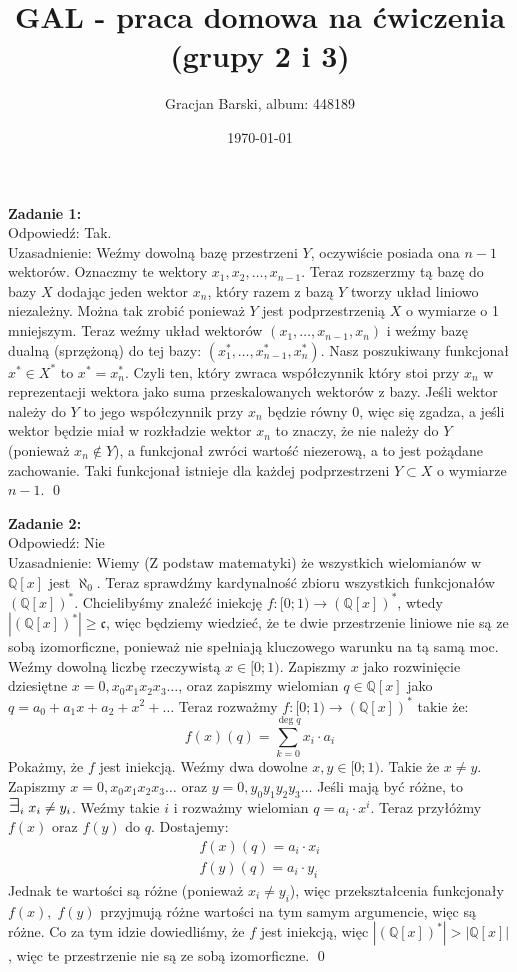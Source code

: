 \documentclass[11pt]{article}
\title{GAL - praca domowa na ćwiczenia (grupy 2 i 3)}
\author{Gracjan Barski, album: 448189}
\date{\today}
\newcommand{\Q}{\mathbb{Q}}
\newcommand{\cont}{\mathfrak{c}}
\newcommand{\Exists}{{\Large\mbox{$\exists$}}}
\begin{document}
\maketitle
\textbf{Zadanie 1:} \\[10pt]
Odpowiedź: Tak. \\[5pt]
Uzasadnienie: Weźmy dowolną bazę przestrzeni $Y$, oczywiście posiada ona $n - 1$ wektorów. Oznaczmy te wektory $x_1, x_2, \ldots, x_{n-1}$. Teraz rozszerzmy tą bazę do bazy $X$ dodając jeden wektor $x_n$, który razem z bazą $Y$ tworzy układ liniowo niezależny. Można tak zrobić ponieważ $Y$ jest podprzestrzenią $X$ o wymiarze o 1 mniejszym. Teraz weźmy układ wektorów $(x_1, \ldots, x_{n - 1}, x_n)$ i weźmy bazę dualną (sprzężoną) do tej bazy: $(x_1^*, \ldots, x_{n - 1}^*, x_n^*)$. Nasz poszukiwany funkcjonał $x^* \in X^*$ to $x^* = x_n^*$. Czyli ten, który zwraca współczynnik który stoi przy $x_n$ w reprezentacji wektora jako suma przeskalowanych wektorów z bazy. Jeśli wektor należy do $Y$ to jego współczynnik przy $x_n$ będzie równy 0, więc się zgadza, a jeśli wektor będzie miał w rozkładzie wektor $x_n$ to znaczy, że nie należy do $Y$ (ponieważ $x_n \notin Y$), a funkcjonał zwróci wartość niezerową, a to jest pożądane zachowanie. Taki funkcjonał istnieje dla każdej podprzestrzeni $Y \subset X$ o wymiarze $n - 1$. \qed

\vspace{20pt}

\textbf{Zadanie 2:} \\[10pt]
Odpowiedź: Nie \\[10pt]
Uzasadnienie: Wiemy (Z podstaw matematyki) że wszystkich wielomianów w $\Q[x]$ jest $\aleph_0$. Teraz sprawdźmy kardynalność zbioru wszystkich funkcjonałów $(\Q[x])^*$. Chcielibyśmy znaleźć iniekcję $f \colon [0; 1) \to (\Q[x])^*$, wtedy $|(\Q[x])^*| \geq \cont$, więc będziemy wiedzieć, że te dwie przestrzenie liniowe nie są ze sobą izomorficzne, ponieważ nie spełniają kluczowego warunku na tą samą moc. \\[5pt]
Weźmy dowolną liczbę rzeczywistą $x \in [0; 1)$. Zapiszmy $x$ jako rozwinięcie dziesiętne $x = 0,x_0x_1x_2x_3\ldots$, oraz zapiszmy wielomian $q \in \Q[x]$ jako $q = a_0 + a_1 x + a_2 + x^2 + \ldots$ Teraz rozważmy $f \colon [0; 1) \to (\Q[x])^*$ takie że:
$$f(x)(q) = \sum_{k = 0}^{\deg q} x_i \cdot a_i$$
Pokażmy, że $f$ jest iniekcją. Weźmy dwa dowolne $x, y \in [0; 1)$. Takie że $x \neq y$. Zapiszmy $x = 0,x_0x_1x_2x_3\ldots$ oraz $y = 0,y_0y_1y_2y_3\ldots$ Jeśli mają być różne, to $\Exists_i \; x_i \neq y_i$. Weźmy takie $i$ i rozważmy wielomian $q = a_i \cdot x^i$. Teraz przyłóżmy $f(x)$ oraz $f(y)$ do $q$. Dostajemy:
\begin{align*}
    f(x)(q) = a_i \cdot x_i \\
    f(y)(q) = a_i \cdot y_i
\end{align*}
Jednak te wartości są różne (ponieważ $x_i \neq y_i$), więc przekształcenia funkcjonały $f(x), \; f(y)$ przyjmują różne wartości na tym samym argumencie, więc są różne. Co za tym idzie dowiedliśmy, że $f$ jest iniekcją, więc $|(\Q[x])^*| > |\Q[x]|$, więc te przestrzenie nie są ze sobą izomorficzne. \qed
\end{document}
